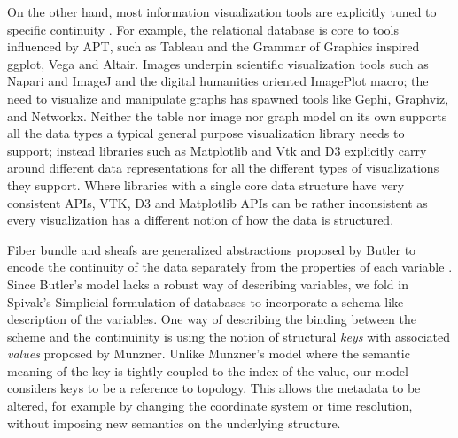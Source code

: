 \documentclass[journal]{vgtc}                %
\begin{document}
On the other hand, most information visualization tools are explicitly tuned to specific continuity \cite{HeerSoftware2006,toryRethinkingVisualizationHighlevel2004}. For example, the relational database is core to tools influenced by APT, such as
Tableau\cite{StoltePolaris2002,hanrahanVizQL2006,MackinlayShowme2007} and the Grammar of Graphics\cite{wilkinsonGrammarGraphics2005} inspired ggplot\cite{wickhamGgplot2ElegantGraphics2016a}, Vega\cite{satyanarayanDeclarativeInteractionDesign2014} and Altair\cite{vanderplasAltairInteractiveStatistical2018}. Images underpin scientific visualization tools such as Napari\cite{nicholas_sofroniew_2021_4533308} and ImageJ\cite{schneiderNIHImageImageJ2012} and the digital humanities oriented ImagePlot\cite{studiesCulturevisImageplot2021} macro; the need to visualize and manipulate graphs has spawned tools like Gephi\cite{bastianGephiOpenSource2009}, Graphviz\cite{ellsonGraphvizOpenSource2002}, and Networkx\cite{HagbergExploringNetwork2008}. Neither the table nor image nor graph model on its own supports all the data types a typical general purpose visualization library needs to support; instead libraries such as Matplotlib\cite{hunterMatplotlib2DGraphics2007} and Vtk\cite{hanwellVisualizationToolkitVTK2015, geveci2012vtk} and D3 \cite{bostockDataDrivenDocuments2011} explicitly carry around different data representations for all the different types of visualizations they support.  Where libraries with a single core data structure have very consistent APIs, VTK, D3 and Matplotlib APIs can be rather inconsistent as every visualization has a different notion of how the data is structured.

Fiber bundle and sheafs are generalized abstractions proposed by Butler to encode the continuity of the data separately from the properties of each variable  \cite{butlerVisualizationModelBased1989,butlerVectorBundleClassesForm1992}. Since Butler's model lacks a robust way of describing variables, we fold in Spivak's Simplicial formulation of databases \cite{spivakDatabasesAreCategories2010,spivakSIMPLICIALDATABASES} to incorporate a schema like description of the variables. One way of describing the binding between the scheme and the continuinity is using the notion of structural \textit{keys} with associated \textit{values} proposed by Munzner\cite{munznerVisualizationAnalysisDesign2014}. Unlike Munzner's model where the semantic meaning of the key is tightly coupled to the index of the value, our model considers keys to be a reference to topology. This allows the metadata to be altered, for example by changing the coordinate system or time resolution, without imposing new semantics on the underlying structure. 
\end{document}
